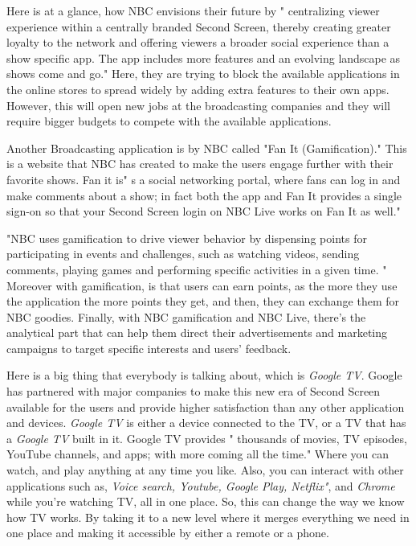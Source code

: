 \documentclass[12pt, oneside]{amsart}   	%
\begin{document}
Here is at a glance, how NBC envisions their future by " centralizing viewer experience within a centrally branded Second Screen, thereby creating greater loyalty to the network and offering viewers a broader social experience than a show specific app.  The app includes more features and an evolving landscape as shows come and go." \cite{Second-Screen-Art}  Here, they are trying to block the available applications in the online stores to spread widely by adding extra features to their own apps.  However, this will open new jobs at the broadcasting companies and they will require bigger budgets to compete with the available applications.

Another Broadcasting application is by NBC called "Fan It (Gamification)." This is a website that NBC has created to make the users engage further with their favorite shows.  Fan it is" s a social networking portal, where fans can log in and make comments about a show; in fact both the app and Fan It provides a single sign-on so that your Second Screen login on NBC Live works on Fan It as well." \cite{Second-Screen-Art}

"NBC uses gamification to drive viewer behavior by dispensing points for participating in events and 
challenges, such as watching videos, sending comments, playing games and performing specific 
activities in a given time. "\cite{Second-Screen-Art}  Moreover with gamification, is that users can earn points, as the more they use the application the more points they get, and then, they can exchange them for NBC goodies.  Finally, with NBC gamification and NBC Live, there's the analytical part that can help them direct their advertisements and marketing campaigns to target specific interests and 
users' feedback.

Here is a big thing that everybody is talking about, which is  \emph{Google TV}.  Google has partnered with major companies to make this new era of Second Screen available for the users and provide higher satisfaction than any other application and devices.   \emph{Google TV} is either a device connected to the TV, or a TV that has a  \emph{Google TV} built in it.  Google TV provides " thousands of movies, TV episodes, YouTube channels, and apps; with more coming all the time."\cite{Google} Where you can watch, and play anything at any time you like.  Also, you can interact with other applications such as,  \emph{Voice search, Youtube, Google Play, Netflix"},  and  \emph{Chrome} while you're watching TV, all in one place.  So, this can change the way we know how TV works. By taking it to a new level where it merges everything we need in one place and making it accessible by either a remote or a phone.
\end{document}
